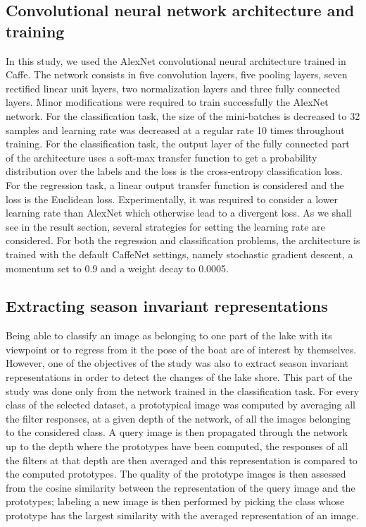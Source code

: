 \subsection{Convolutional neural network architecture and training}

In this study, we used the AlexNet convolutional neural architecture\cite{NIPS2012_4824} trained in Caffe\cite{jia2014caffe}. The network consists in five convolution layers, five pooling layers, seven rectified linear unit layers, two normalization layers and three fully connected layers. Minor modifications were required to train successfully the AlexNet network. For the classification task, the size of the mini-batches is decreased to 32 samples and learning rate was decreased at a regular rate 10 times throughout training. For the classification task, the output layer of the fully connected part of the architecture uses a soft-max transfer function to get a probability distribution over the labels and the loss is the cross-entropy classification loss. For the regression task, a linear output transfer function is considered and the loss is the Euclidean loss. Experimentally, it was required to consider a lower learning rate than AlexNet which otherwise lead to a divergent loss. As we shall see in the result section, several strategies for setting the learning rate are considered. For both the regression and classification problems, the architecture is trained with the default CaffeNet settings, namely stochastic gradient descent, a momentum set to 0.9 and a weight decay to 0.0005.


\subsection{Extracting season invariant representations}

Being able to classify an image as belonging to one part of the lake with its viewpoint or to regress from it the pose of the boat are of interest by themselves. However, one of the objectives of the study was also to extract season invariant representations in order to detect the changes of the lake shore. This part of the study was done only from the network trained in the classification task. For every class of the selected dataset, a prototypical image was computed by averaging all the filter responses, at a given depth of the network, of all the images belonging to the considered class. A query image is then propagated through the network up to the depth where the prototypes have been computed, the responses of all the filters at that depth are then averaged and this representation is compared to the computed prototypes. The quality of the prototype images is then assessed from the cosine similarity between the representation of the query image and the prototypes; labeling a new image is then performed by picking the class whose prototype has the largest similarity with the averaged representation of an image.
